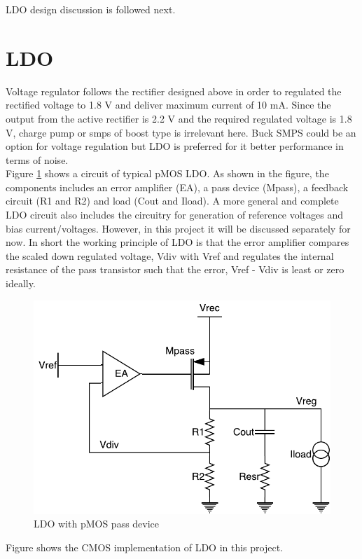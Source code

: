 \documentclass[12pt,a4paper,UKenglish]{article}
\begin{document}
LDO design discussion is followed next.

\newpage

\section{LDO}
Voltage regulator follows the rectifier designed above in order to regulated the rectified voltage to 1.8 V and deliver maximum current of 10 mA. Since the output from the active rectifier is 2.2 V and the required regulated voltage is 1.8 V, charge pump or  \acrshort{smps} of boost type is irrelevant here. Buck SMPS could be an option for voltage regulation but LDO is preferred for it better performance in terms of noise. \\

Figure \ref{ldo_gen} shows a circuit of typical pMOS LDO. As shown in the figure, the components includes an error amplifier (EA), a pass device (Mpass), a feedback circuit (R1 and R2) and load (Cout and Iload). A more general and complete LDO circuit also includes the circuitry for generation of reference voltages and bias current/voltages. However, in this project it will be discussed separately for now. In short the working principle of LDO is that the error amplifier compares the scaled down regulated voltage, Vdiv with Vref and regulates the internal resistance of the pass transistor such that  the error, Vref - Vdiv is least or zero ideally. 

\begin{figure}[htbp] %
   \centering
   \includegraphics[width=.8\textwidth]{img/ldo.pdf} 
   \caption{LDO with pMOS pass device}
   \label{ldo_gen}
\end{figure}

Figure shows the CMOS implementation of LDO in this project. 

\newpage
\printbibliography

\newpage
\listoffigures

\newpage
\listoftables

\newpage
\printnoidxglossaries
\end{document}
